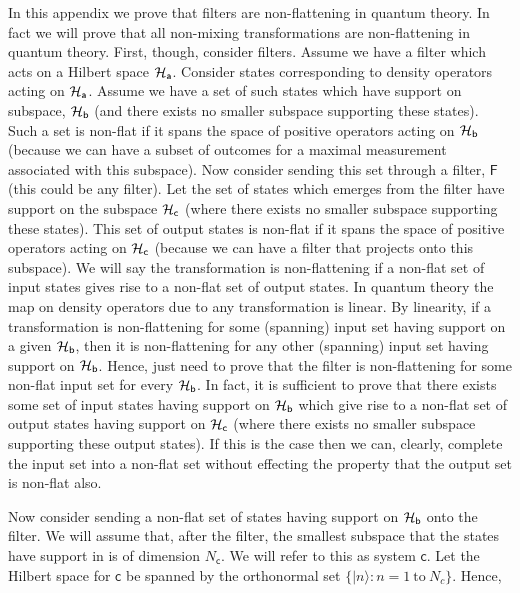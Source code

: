 \documentclass[10pt]{article}
\begin{document}
In this appendix we prove that filters are non-flattening in quantum theory. In fact we will prove that all non-mixing transformations are non-flattening in quantum theory. First, though, consider filters.  Assume we have a filter which acts on a Hilbert space ${\cal H}_\mathsf{a}$.  Consider states corresponding to density operators acting on ${\cal H}_\mathsf{a}$.   Assume we have a set of such states which have support on subspace, ${\cal H}_\mathsf{b}$ (and there exists no smaller subspace supporting these states).   Such a set is non-flat if it spans the space of positive operators acting on ${\cal H}_\mathsf{b}$ (because we can have a subset of outcomes for a maximal measurement associated with this subspace).   Now consider sending this set through a filter, $\mathsf F$ (this could be any filter).   Let the set of states which emerges from the filter have support on the subspace ${\cal H}_\mathsf{c}$ (where there exists no smaller subspace supporting these states).  This set of output states is non-flat if it spans the space of positive operators acting on ${\cal H}_\mathsf{c}$ (because we can have a filter that projects onto this subspace).   We will say the transformation is non-flattening if a non-flat set of input states gives rise to a non-flat set of output states.  In quantum theory the map on density operators due to any transformation is linear. By linearity, if a transformation is non-flattening for some (spanning) input set having support on a given ${\cal H}_\mathsf{b}$, then it is non-flattening for any other (spanning) input set having support on ${\cal H}_\mathsf{b}$.
Hence, just need to prove that the filter is non-flattening for some non-flat input set for every ${\cal H}_\mathsf{b}$.  In fact, it is sufficient to prove that there exists some set of input states having support on ${\cal H}_\mathsf{b}$ which give rise to a non-flat set of output states having support on ${\cal H}_\mathsf{c}$ (where there exists no smaller subspace supporting these output states).  If this is the case then we can, clearly, complete the input set into a non-flat set without effecting the property that the output set is non-flat also.

Now consider sending a non-flat set of states having support on ${\cal H}_\mathsf{b}$ onto the filter.  We will assume that, after the filter, the smallest subspace that the states have support in is of dimension $N_\mathsf{c}$.  We will refer to this as system $\mathsf c$.  Let the Hilbert space for $\mathsf c$ be spanned by the orthonormal set $\{ |n\rangle: n=1~\text{to}~N_c\}$.  Hence,
\end{document}
